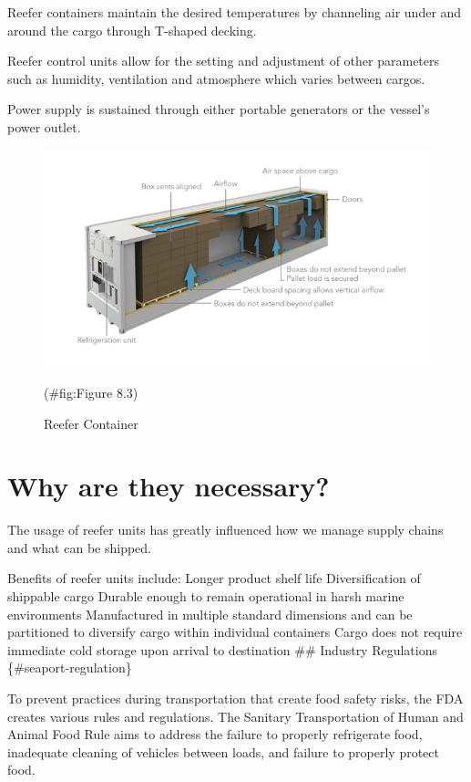 \documentclass[
]{book}
\begin{document}
Reefer containers maintain the desired temperatures by channeling air under and around the cargo through T-shaped decking.

Reefer control units allow for the setting and adjustment of other parameters such as humidity, ventilation and atmosphere which varies between cargos.

Power supply is sustained through either portable generators or the vessel's power outlet.

\begin{figure}

{\centering \includegraphics{./Images/seaport operation/Reefer Container} 

}

\caption{Reefer Container }(\#fig:Figure 8.3)
\end{figure}

\hypertarget{seaport-necessary}{%
\section{Why are they necessary?}\label{seaport-necessary}}

The usage of reefer units has greatly influenced how we manage supply chains and what can be shipped.

Benefits of reefer units include:
Longer product shelf life
Diversification of shippable cargo
Durable enough to remain operational in harsh marine environments
Manufactured in multiple standard dimensions and can be partitioned to diversify cargo within individual containers
Cargo does not require immediate cold storage upon arrival to destination
\#\# Industry Regulations \{\#seaport-regulation\}

To prevent practices during transportation that create food safety risks, the FDA creates various rules and regulations. The Sanitary Transportation of Human and Animal Food Rule aims to address the failure to properly refrigerate food, inadequate cleaning of vehicles between loads, and failure to properly protect food.
\end{document}

